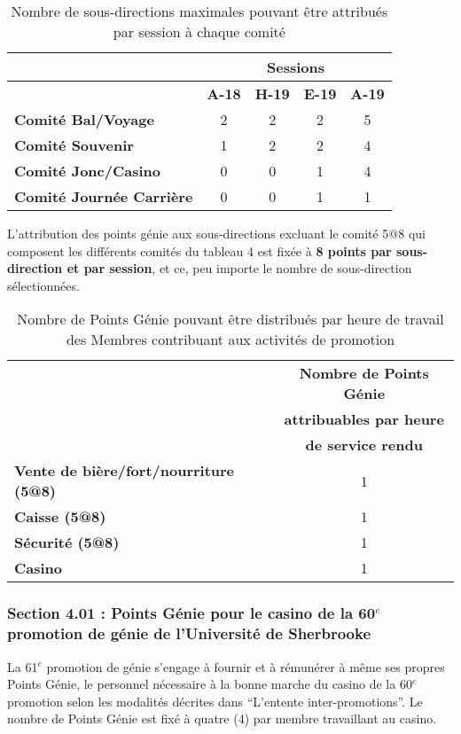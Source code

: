 \begin{table}[H]
    \centering
    \caption{Nombre de sous-directions maximales pouvant être attribués par session à chaque comité}
    \begin{tabular}{|l|c|c|c|c|}
      \hline
       &\multicolumn{4}{|c|}{\textbf{Sessions}} \\ 
      \hline
       & \textbf{A-18} & \textbf{H-19} & \textbf{E-19} & \textbf{A-19} \\
      \hline
      \textbf{Comité Bal/Voyage} & 2 & 2 & 2 & 5 \\
      \hline
      \textbf{Comité Souvenir} & 1 & 2 & 2 & 4 \\
      \hline
      \textbf{Comité Jonc/Casino} & 0 & 0 & 1 & 4 \\
      \hline
      \textbf{Comité Journée Carrière} & 0 & 0 & 1 & 1 \\
      \hline
    \end{tabular}
\end{table}

L’attribution des points génie aux sous-directions excluant le comité 5@8 qui composent les différents comités du tableau 4 est fixée à \textbf{8 points par sous-direction et par session}, et ce, peu importe le nombre de sous-direction sélectionnées.

\begin{table}[H]
    \centering
    \caption{Nombre de Points Génie pouvant être distribués par heure de travail des Membres contribuant aux activités de promotion}
    \begin{tabular}{|l|c|}
      \hline
      & \textbf{Nombre de Points Génie} \\
      & \textbf{attribuables par heure} \\
      & \textbf{de service rendu}\\
      \hline
      \textbf{Vente de bière/fort/nourriture (5@8)} & 1 \\
      \hline
      \textbf{Caisse (5@8)} & 1 \\
      \hline
      \textbf{Sécurité (5@8)} & 1 \\
      \hline
      \textbf{Casino} & 1 \\
      \hline
    \end{tabular}
    \label{comite}
\end{table}

\subsubsection*{Section 4.01 : Points Génie pour le casino de la 60$^e$ promotion de génie de l'Université de Sherbrooke}
La 61$^e$ promotion de génie s’engage à fournir et à rémunérer à même ses propres Points Génie, le personnel nécessaire à la bonne marche du casino de la 60$^e$ promotion selon les modalités décrites dans “L’entente inter-promotions”. Le nombre de Points Génie est fixé à quatre (4) par membre travaillant au casino. 

